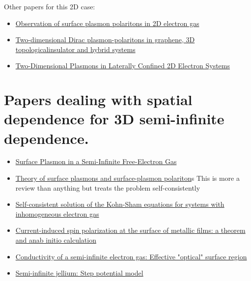 \documentclass[11pt]{article}
\begin{document}
Other papers for this 2D case:

\begin{itemize}
\item \href{./1705.07423.pdf}{Observation of surface plasmon polaritons in 2D electron gas}

\item \href{./s41377-022-01012-2.pdf}{Two-dimensional Dirac plasmon-polaritons in graphene, 3D topologicalinsulator and hybrid systems}
\end{itemize}


\begin{itemize}
\item \href{./nanomaterials-13-00975.pdf}{Two-Dimensional Plasmons in Laterally Confined 2D Electron Systems}
\end{itemize}





\section{Papers dealing with spatial dependence for 3D semi-infinite dependence.}
\label{sec:org012def6}


\begin{itemize}
\item \href{https://journals.aps.org/prb/abstract/10.1103/PhysRevB.3.2270}{Surface Plasmon in a Semi-Infinite Free-Electron Gas}

\item \href{./0611257.pdf}{Theory of surface plasmons and surface-plasmon polariton}s
This is more a review than anything but treats the problem self-consistently

\item \href{./0209335.pdf}{Self-consistent solution of the Kohn-Sham equations for systems with inhomogeneous electron gas}

\item \href{./Tokatly\_\_2014\_1015.pdf}{Current-induced spin polarization at the surface of metallic films: a theorem and anab initio calculation}

\item \href{./12-PRB-20-3186-79.pdf}{Conductivity of a semi-infinite electron gas: Effective "optical" surface region}

\item \href{./1511.08708.pdf}{Semi-infinite jellium: Step potential model}
\end{itemize}
\end{document}
